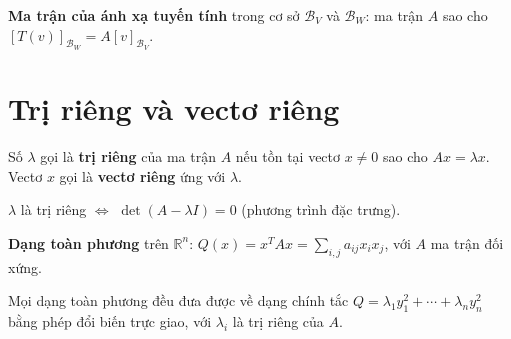 \documentclass[12pt,a4paper]{article}
\begin{document}
\begin{dinhnghia}
  \textbf{Ma trận của ánh xạ tuyến tính} trong cơ sở $\mathcal{B}_V$ và $\mathcal{B}_W$: ma trận $A$ sao cho $[T(v)]_{\mathcal{B}_W} = A [v]_{\mathcal{B}_V}$.
\end{dinhnghia}

\section{Trị riêng và vectơ riêng}

\begin{dinhnghia}
  Số $\lambda$ gọi là \textbf{trị riêng} của ma trận $A$ nếu tồn tại vectơ $x \ne 0$ sao cho $Ax = \lambda x$. Vectơ $x$ gọi là \textbf{vectơ riêng} ứng với $\lambda$.
\end{dinhnghia}

\begin{congthuc}
  $\lambda$ là trị riêng $\Leftrightarrow$ $\det(A - \lambda I) = 0$ (phương trình đặc trưng).
\end{congthuc}

\begin{dinhnghia}
  \textbf{Dạng toàn phương} trên $\mathbb{R}^n$: $Q(x) = x^T A x = \sum_{i,j} a_{ij} x_i x_j$, với $A$ ma trận đối xứng.
\end{dinhnghia}

\begin{dinhly}[title={Dạng chính tắc}]
  Mọi dạng toàn phương đều đưa được về dạng chính tắc $Q = \lambda_1 y_1^2 + \cdots + \lambda_n y_n^2$ bằng phép đổi biến trực giao, với $\lambda_i$ là trị riêng của $A$.
\end{dinhly}
\end{document}

